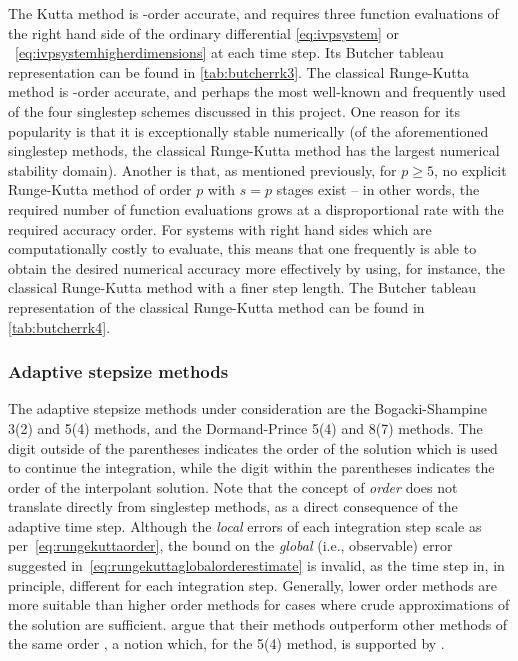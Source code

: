 The Kutta method is -order accurate, and requires three function
evaluations of the right hand side of the ordinary differential
\cref{eq:ivpsystem} or ~\eqref{eq:ivpsystemhigherdimensions} at each time
step. Its Butcher tableau representation can be found in \cref{tab:butcherrk3}.
The classical Runge-Kutta method is -order accurate, and perhaps the most
well-known and frequently used of the four singlestep schemes discussed in this
project. One reason for its popularity is that it is exceptionally stable
numerically (of the aforementioned singlestep methods, the classical
Runge-Kutta method has the largest numerical stability domain). Another is that,
as mentioned previously, for $p\geq5$, no explicit Runge-Kutta method of order
$p$ with $s=p$ stages exist
\parencite[p.173]{hairer1993solving} -- in other words,
the required number of function evaluations grows at a disproportional rate with
the required accuracy order. For systems with right hand sides which are
computationally costly to evaluate, this means that one frequently is able to
obtain the desired numerical accuracy more effectively by using, for instance,
the classical Runge-Kutta method with a finer step length. The Butcher tableau
representation of the classical Runge-Kutta method can be found in
\cref{tab:butcherrk4}.


\clearpage


\subsubsection{Adaptive stepsize methods}
\label{ssub:adaptive_stepsize_methods}

The adaptive stepsize methods under consideration are the Bogacki-Shampine
3(2) and 5(4) methods, and the Dormand-Prince 5(4) and 8(7) methods. The digit
outside of the parentheses indicates the order of the solution which is used
to continue the integration, while the digit within the parentheses indicates
the order of the interpolant solution. Note that the concept of \emph{order}
does not translate directly from singlestep methods, as a direct consequence
of the adaptive time step. Although the \emph{local} errors of each integration
step scale as per~\cref{eq:rungekuttaorder}, the bound on the \emph{global}
(i.e., observable) error suggested in~\cref{eq:rungekuttaglobalorderestimate}
is invalid, as the time step in, in principle, different for each integration
step. Generally, lower order methods are more suitable than higher order methods
for cases where crude approximations of the solution are sufficient.
\citeauthor{bogacki1989pair} argue that their methods
outperform other methods of the same order
\parencite{bogacki1989pair,bogacki1996efficient}, a notion which, for the 5(4)
method, is supported by
\textcite[p.194]{hairer1993solving}.

